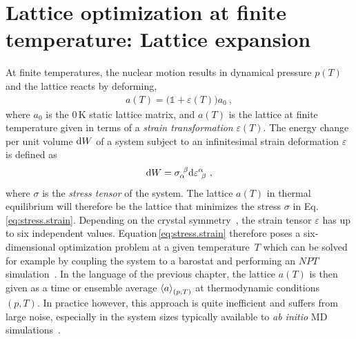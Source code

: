 \section{Lattice optimization at finite temperature: Lattice expansion}
\label{sec:app.lattice_expansion}
At finite temperatures,
the nuclear motion results in dynamical pressure $p(T)$ and the lattice reacts by deforming,
\begin{align}
a (T) = \bm ( \mathds 1 + \varepsilon (T) \bm ) a_0~,
\label{eq:lattice.T}
\end{align}
where $a_0$ is the 0\,K static lattice matrix, and $a (T)$ is the lattice at finite temperature given in terms of a \emph{strain transformation} $\varepsilon (T)$. 
The energy change per unit volume ${\rm d} W$ of a system subject to an infinitesimal strain deformation $\varepsilon$ is defined as
\begin{align}
\d W = \sigma_{\alpha}^{~\beta} \d \varepsilon^{\alpha}_{~\beta}~,
\label{eq:stress.strain}
\end{align}
where $\sigma$ is the \emph{stress tensor} of the system. The lattice $a(T)$ in thermal equilibrium will therefore be the lattice that minimizes the stress $\sigma$ in Eq.\,\eqref{eq:stress.strain}. Depending on the crystal symmetry~\cite{Nye1985}, the strain tensor $\varepsilon$ has up to six independent values. Equation\,\eqref{eq:stress.strain} therefore poses a six-dimensional optimization problem at a given temperature~$T$ which can be solved for example by coupling the system to a barostat and performing an $NPT$ simulation~. In the language of the previous chapter, the lattice $a(T)$ is then given as a time or ensemble average $\braket{a}_{(p, T)}$ at thermodynamic conditions $(p, T)$. In practice however, this approach is quite inefficient and suffers from large noise, especially in the system sizes typically available to \emph{ab initio} MD simulations~.

